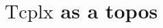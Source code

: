 \documentclass{article}
\newtheorem{theorem}{Theorem}[subsection]
\theoremstyle{remark}
\theoremstyle{definition}
\newtheorem{definition}{Definition}[subsection]
\newcommand{\N}{\mathbb N}
\newcommand{\Fin}{\mathrm{Fin}}
\newcommand{\Set}{\mathrm{Set}}
\newcommand{\op}{\mathrm{op}}
\newcommand{\ASC}{\mathsf{ASC}}
\newcommand{\im}{\mathrm{im}}
\newcommand{\id}{\mathrm{id}}
\newcommand{\X}{\mathcal X}
\newcommand{\Tcplx}{\mathrm{Tcplx}}
\newcommand{\M}{\mathcal M}
\begin{document}
	\section{$\Tcplx$ as a topos}
	\begin{comment}
	\subsection{Polyhedral T-complexes}
	\begin{definition}[Curried cartesian product]
		Let $\M:\Fin_+\to\Fin_+^{\Fin_+}$ be the adjunct/curried version of the cartesian product functor $\times:\Fin_+\times\Fin_+\to\Fin_+$.
	\end{definition}
	\begin{definition}[Polyhedral presheaves]
		Let $P:\Fin_+^\op\to\Set$ be a presheaf and $n\in\N_+$. Because $\Fin_+$ has binary products, $P\circ\M(n)$ is also a presheaf over $\Fin_+$. We call this the \textit{$n$-polyhedral presheaf} for $P$, or the \textit{presheaf of $n$-polyhedra} in $P$.
	\end{definition}
	The goal of this subsection is to prove that for every T-complex $(P,\phi)$ and every $n\in\N_+$, $P\circ\M(n)$ can also be given a T-complex structure.
	\begin{definition}\label{polyscomp}
		Let $m,n\in\N_+$, $C\in\ASC_n$ and $c:\X(C)\to P\circ\M(m)$ a simplicial complex in the polyhedral presheaf. Let $\pi^1_{m,n}:m\times n\to m$ and $\pi^2_{m,n}:m\times n\to n$ denote the canonical projections from the cartesian product in $\Fin_+$. Then for every $f:l\to m\times n$ with $\im(f)\in C^{\pi^2_{m,n}}$, we can obtain the following:
		\[f:l\to m\times n\quad\longmapsto\quad\pi^2_{m,n}\circ f:l\to n\quad\longmapsto\quad c_l(\pi^2_{m,n}\circ f)\in P(m\times l)\]
		as well as:
		\[f:l\to m\times n\longmapsto(\pi^1_{m,n}\circ f;\ \id_l):l\to m\times l\longmapsto P(\pi^1_{m,n}\circ f;\ \id_l):P(m\times l)\to P(l)\]
		Putting both together we get an element of $P(l)$. We shall name this operation $\tau(c)_l$ for each $l\in\N_+$. To summarize, $\tau(c)_l$ is defined as follows:
		\begin{equation}\label{tau}
			\tau(c)_l:\X(C^{\pi^2_{m,n}})(l)\to P(l)\qquad f\mapsto P(\pi^1_{m,n}\circ f;\id_l)(c_l(\pi^2_{m,n}\circ f))
		\end{equation}
	\end{definition}
	\begin{theorem}
		For every simplicial complex $c:\X(C)\to P\circ\M(m)$, $\tau(c)_l:\X(C^{\pi^2_{m,n}})(l)\to P(l)$ is natural in $l\in\Fin_+$. Hence, we may view $\tau(c):\X(C^{\pi^2_{m,n}})\to P$ as a natural transformation and hence a simplicial complex in $P$.

\end{comment}
\end{document}
